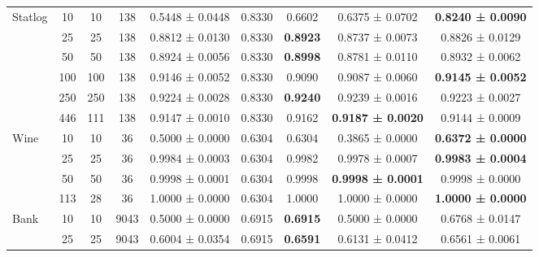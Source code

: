 \begin{table}
{\begin{tabular}[H]{@{}lcccccccc@{}}
                              \midrule
\multirow{6}{*}{Statlog}      & 10    & 10   & 138  & 0.5448 ± 0.0448      & 0.8330               & 0.6602          & 0.6375 ± 0.0702          & \textbf{0.8240 ± 0.0090} \\
                              & 25    & 25   & 138  & 0.8812 ± 0.0130      & 0.8330               & \textbf{0.8923} & 0.8737 ± 0.0073          & 0.8826 ± 0.0129          \\
                              & 50    & 50   & 138  & 0.8924 ± 0.0056      & 0.8330               & \textbf{0.8998} & 0.8781 ± 0.0110          & 0.8932 ± 0.0062          \\
                              & 100   & 100  & 138  & 0.9146 ± 0.0052      & 0.8330               & 0.9090          & 0.9087 ± 0.0060          & \textbf{0.9145 ± 0.0052} \\
                              & 250   & 250  & 138  & 0.9224 ± 0.0028      & 0.8330               & \textbf{0.9240} & 0.9239 ± 0.0016          & 0.9223 ± 0.0027          \\
                              & 446   & 111  & 138  & 0.9147 ± 0.0010      & 0.8330               & 0.9162          & \textbf{0.9187 ± 0.0020} & 0.9144 ± 0.0009          \\
                              \midrule
\multirow{4}{*}{Wine}         & 10    & 10   & 36   & 0.5000 ± 0.0000      & 0.6304               & 0.6304          & 0.3865 ± 0.0000          & \textbf{0.6372 ± 0.0000} \\
                              & 25    & 25   & 36   & 0.9984 ± 0.0003      & 0.6304               & 0.9982          & 0.9978 ± 0.0007          & \textbf{0.9983 ± 0.0004} \\
                              & 50    & 50   & 36   & 0.9998 ± 0.0001      & 0.6304               & 0.9998          & \textbf{0.9998 ± 0.0001} & 0.9998 ± 0.0000          \\
                              & 113   & 28   & 36   & 1.0000 ± 0.0000      & 0.6304               & 1.0000          & 1.0000 ± 0.0000          & \textbf{1.0000 ± 0.0000} \\
                              \midrule
\multirow{7}{*}{Bank}         & 10    & 10   & 9043 & 0.5000 ± 0.0000      & 0.6915               & \textbf{0.6915} & 0.5000 ± 0.0000          & 0.6768 ± 0.0147          \\
                              & 25    & 25   & 9043 & 0.6004 ± 0.0354      & 0.6915               & \textbf{0.6591} & 0.6131 ± 0.0412          & 0.6561 ± 0.0061          \\

\end{tabular}}
\end{table}
